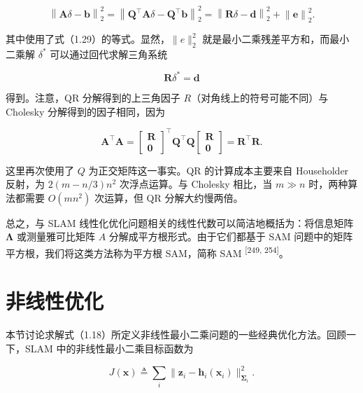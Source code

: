 \begin{equation}
\left\| \boldsymbol {A} \delta - \boldsymbol {b} \right\| _ {2} ^ {2} = \left\| \boldsymbol {Q} ^ {\top} \boldsymbol {A} \delta - \boldsymbol {Q} ^ {\top} \boldsymbol {b} \right\| _ {2} ^ {2} = \left\| \boldsymbol {R} \delta - \boldsymbol {d} \right\| _ {2} ^ {2} + \left\| \boldsymbol {e} \right\| _ {2} ^ {2}.\tag{1.31}
\end{equation}

其中使用了式（1.29）的等式。显然，$\|e\|_2^2$ 就是最小二乘残差平方和，而最小二乘解 $\delta^*$ 可以通过回代求解三角系统

\begin{equation}
\boldsymbol {R} \delta^ {*} = \boldsymbol {d}\tag{1.32}
\end{equation}

得到。注意，QR 分解得到的上三角因子 $R$（对角线上的符号可能不同）与 Cholesky 分解得到的因子相同，因为

\begin{equation}
\boldsymbol {A} ^ {\top} \boldsymbol {A} = \left[ \begin{array}{c} \boldsymbol {R} \\ \boldsymbol {0} \end{array} \right] ^ {\top} \boldsymbol {Q} ^ {\top} \boldsymbol {Q} \left[ \begin{array}{c} \boldsymbol {R} \\ \boldsymbol {0} \end{array} \right] = \boldsymbol {R} ^ {\top} \boldsymbol {R}.\tag{1.33}
\end{equation}

这里再次使用了 $Q$ 为正交矩阵这一事实。QR 的计算成本主要来自 Householder 反射，为 $2(m-n/3)n^2$ 次浮点运算。与 Cholesky 相比，当 $m\gg n$ 时，两种算法都需要 $O(mn^2)$ 次运算，但 QR 分解大约慢两倍。

总之，与 SLAM 线性化优化问题相关的线性代数可以简洁地概括为：将信息矩阵 $\pmb\Lambda$ 或测量雅可比矩阵 $A$ 分解成平方根形式。由于它们都基于 SAM 问题中的矩阵平方根，我们将这类方法称为平方根 SAM，简称 SAM \textsuperscript{[249, 254]}。

\section{非线性优化}

本节讨论求解式（1.18）所定义非线性最小二乘问题的一些经典优化方法。回顾一下，SLAM 中的非线性最小二乘目标函数为

\begin{equation}
J (\boldsymbol {x}) \triangleq \sum_ {i} \| \boldsymbol {z} _ {i} - \boldsymbol {h} _ {i} (\boldsymbol {x} _ {i}) \| _ {\boldsymbol {\Sigma} _ {i}} ^ {2}.\tag{1.34}
\end{equation}

